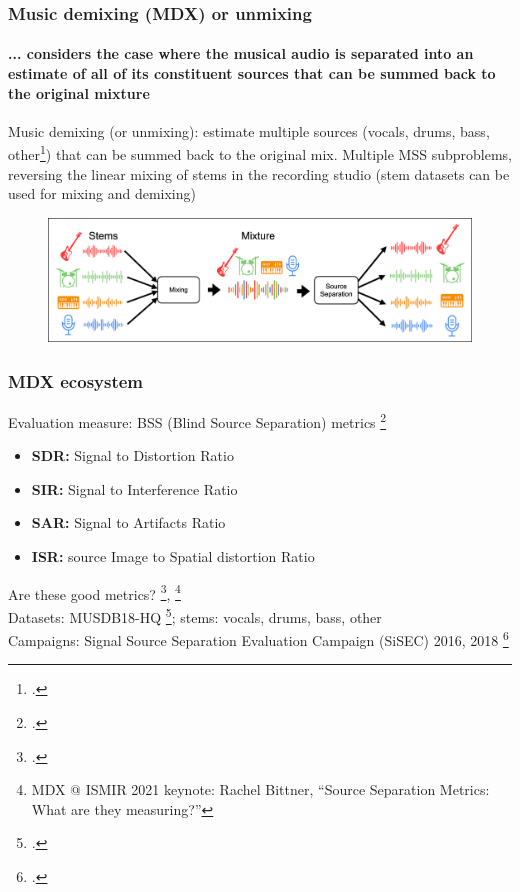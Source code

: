 \documentclass[usenames,dvipsnames]{beamer}
\begin{document}
\begin{frame}
	\frametitle{Music demixing (MDX) or unmixing}
	\framesubtitle{... considers the case where the musical audio is separated into an estimate of all of its constituent sources that can be summed back to the original mixture}
	Music demixing (or unmixing): estimate multiple sources (vocals, drums, bass, other\footcite{musdb18hq}) that can be summed back to the original mix. Multiple MSS subproblems, reversing the linear mixing of stems in the recording studio (stem datasets can be used for mixing and demixing)
	\begin{figure}[ht]
		\centering
		\includegraphics[width=12cm]{./images-mss/mixdemix.png}
	\end{figure}
\end{frame}

\begin{frame}
	\frametitle{MDX ecosystem}
	Evaluation measure: BSS (Blind Source Separation) metrics \footcite{bss, bss2}
	\begin{itemize}
	\item
		\textbf{SDR:} Signal to Distortion Ratio
	\item
		\textbf{SIR:} Signal to Interference Ratio
	\item
		\textbf{SAR:} Signal to Artifacts Ratio
	\item
		\textbf{ISR:} source Image to Spatial distortion Ratio
	\end{itemize}
	Are these good metrics? \footcite{roux2018sdr}, \footnote{MDX @ ISMIR 2021 keynote: Rachel Bittner, ``Source Separation Metrics: What are they measuring?''}\\
	Datasets: MUSDB18-HQ \footcite{musdb18, musdb18hq}; stems: vocals, drums, bass, other\\
	Campaigns: Signal Source Separation Evaluation Campaign (SiSEC) 2016, 2018 \footcite{sisec2016, sisec2018}\\
\end{frame}
\end{document}
